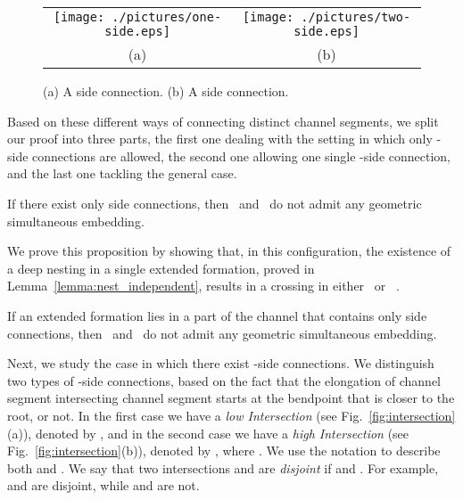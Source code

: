 \documentclass[a4paper,10pt]{llncs}
\newcounter{prop}
\newcommand{\T}{\mbox{ }}
\renewcommand{\P}{\mbox{ }}
\begin{document}
\begin{figure}[htb]
\begin{center}
\begin{tabular}{c c}
\mbox{\texttt{[image: ./pictures/one-side.eps]}} \hspace{1cm} &
\mbox{\texttt{[image: ./pictures/two-side.eps]}} \\
(a) & (b)\\
\end{tabular}
\caption{(a) A side connection. (b) A side connection.}
\label{fig:12-side-connection}
\end{center}
\end{figure}

Based on these different ways of connecting distinct channel segments, we split our proof into three parts, the first one dealing with the setting in which only -side connections are allowed, the second one allowing one single -side connection, and the last one tackling the general case.

\begin{proposition}\label{prop:only-1-side}
If there exist only side connections, then \T and \P do not admit any geometric simultaneous embedding.
\end{proposition}

We prove this proposition by showing that, in this configuration, the existence of a deep nesting in a single extended formation, proved in Lemma~\ref{lemma:nest_independent}, results in a crossing in either \T or \P.

\begin{lemma}\label{lemma:k-nesting}
If an extended formation lies in a part of the channel that contains only side connections, then \T and \P do not admit any geometric simultaneous embedding.
\end{lemma}

Next, we study the case in which there exist -side connections. We distinguish two types of -side connections, based on the fact that the elongation of channel segment  intersecting channel segment  starts at the bendpoint that is closer to the root, or not. In the first case we have a \emph{low Intersection} (see Fig.~\ref{fig:intersection}(a)), denoted by , and in the second case we have a \emph{high Intersection} (see Fig.~\ref{fig:intersection}(b)), denoted by , where . We use the notation  to describe both  and . We say that two intersections  and  are \emph{disjoint} if  and . For example,  and  are disjoint, while  and  are not.
\end{document}
